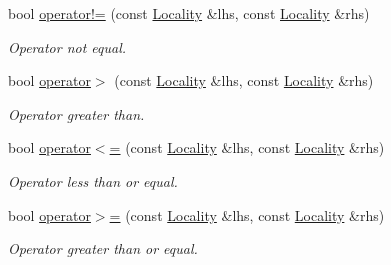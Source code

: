 \begin{DoxyCompactItemize}
bool \hyperlink{classshad_1_1rt_1_1Locality_a71b4448d929b976967fa6cdc081e9f05}{operator!=} (const \hyperlink{classshad_1_1rt_1_1Locality}{Locality} \&lhs, const \hyperlink{classshad_1_1rt_1_1Locality}{Locality} \&rhs)
\begin{DoxyCompactList}\small\item\em Operator not equal. \end{DoxyCompactList}\item 
bool \hyperlink{classshad_1_1rt_1_1Locality_a53d34516e59a139d2741d796ee2958c6}{operator$>$} (const \hyperlink{classshad_1_1rt_1_1Locality}{Locality} \&lhs, const \hyperlink{classshad_1_1rt_1_1Locality}{Locality} \&rhs)
\begin{DoxyCompactList}\small\item\em Operator greater than. \end{DoxyCompactList}\item 
bool \hyperlink{classshad_1_1rt_1_1Locality_ac06cab6087d38235da74aaed42e7022e}{operator$<$=} (const \hyperlink{classshad_1_1rt_1_1Locality}{Locality} \&lhs, const \hyperlink{classshad_1_1rt_1_1Locality}{Locality} \&rhs)
\begin{DoxyCompactList}\small\item\em Operator less than or equal. \end{DoxyCompactList}\item 
bool \hyperlink{classshad_1_1rt_1_1Locality_a86537d57693107caf26f7e813419f069}{operator$>$=} (const \hyperlink{classshad_1_1rt_1_1Locality}{Locality} \&lhs, const \hyperlink{classshad_1_1rt_1_1Locality}{Locality} \&rhs)
\begin{DoxyCompactList}\small\item\em Operator greater than or equal. \end{DoxyCompactList}\end{DoxyCompactItemize}
